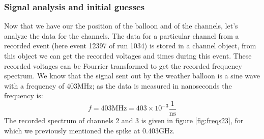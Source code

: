 \subsubsection{Signal analysis and initial guesses}
Now that we have our the position of the balloon and of the channels, let's
analyze the data for the channels. The data for a particular channel from a
recorded event (here event 12397 of run 1034) is stored in a channel object,
from this object we can get the recorded voltages and times during this event.
These recorded voltages can be Fourrier transformed to get the recorded
frequency spectrum.  We know that the signal sent out by the weather balloon is
a sine wave with a frequency of 403MHz; as the data is measured in nanoseconds
the frequency is:
\begin{equation}
	f = 403\text{MHz} = 403\times 10^{-3} \frac{1}{\text{ns}}
\end{equation}
The recorded spectrum of channels 2 and 3 is given in figure \ref{fig:freqs23}, for 
which we previously mentioned the spike at 0.403GHz.
